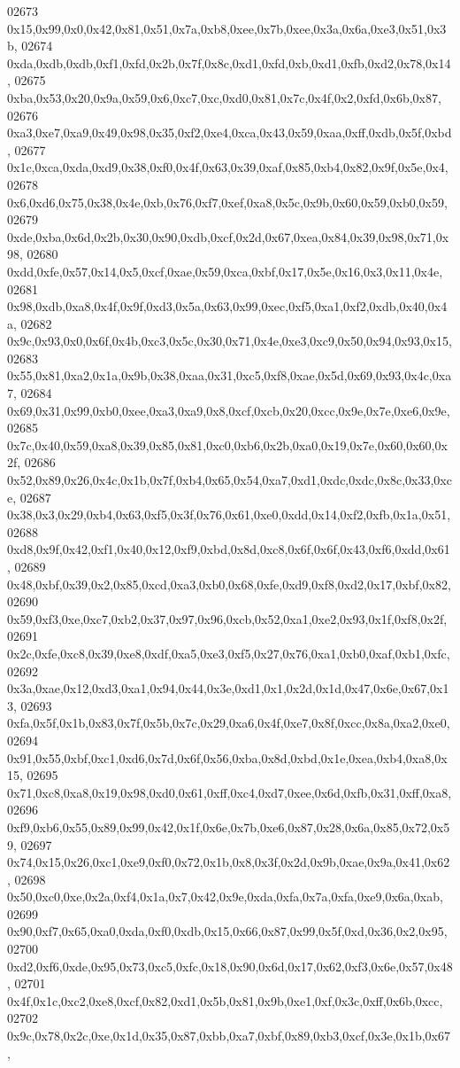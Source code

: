 \begin{DoxyCode}
02673   0x15,0x99,0x0,0x42,0x81,0x51,0x7a,0xb8,0xee,0x7b,0xee,0x3a,0x6a,0xe3,0x51,0x3b,
02674   0xda,0xdb,0xdb,0xf1,0xfd,0x2b,0x7f,0x8c,0xd1,0xfd,0xb,0xd1,0xfb,0xd2,0x78,0x14,
02675   0xba,0x53,0x20,0x9a,0x59,0x6,0xc7,0xc,0xd0,0x81,0x7c,0x4f,0x2,0xfd,0x6b,0x87,
02676   0xa3,0xe7,0xa9,0x49,0x98,0x35,0xf2,0xe4,0xca,0x43,0x59,0xaa,0xff,0xdb,0x5f,0xbd,
02677   0x1c,0xca,0xda,0xd9,0x38,0xf0,0x4f,0x63,0x39,0xaf,0x85,0xb4,0x82,0x9f,0x5e,0x4,
02678   0x6,0xd6,0x75,0x38,0x4e,0xb,0x76,0xf7,0xef,0xa8,0x5c,0x9b,0x60,0x59,0xb0,0x59,
02679   0xde,0xba,0x6d,0x2b,0x30,0x90,0xdb,0xcf,0x2d,0x67,0xea,0x84,0x39,0x98,0x71,0x98,
02680   0xdd,0xfe,0x57,0x14,0x5,0xcf,0xae,0x59,0xca,0xbf,0x17,0x5e,0x16,0x3,0x11,0x4e,
02681   0x98,0xdb,0xa8,0x4f,0x9f,0xd3,0x5a,0x63,0x99,0xec,0xf5,0xa1,0xf2,0xdb,0x40,0x4a,
02682   0x9c,0x93,0x0,0x6f,0x4b,0xc3,0x5c,0x30,0x71,0x4e,0xe3,0xc9,0x50,0x94,0x93,0x15,
02683   0x55,0x81,0xa2,0x1a,0x9b,0x38,0xaa,0x31,0xc5,0xf8,0xae,0x5d,0x69,0x93,0x4c,0xa7,
02684   0x69,0x31,0x99,0xb0,0xee,0xa3,0xa9,0x8,0xcf,0xcb,0x20,0xcc,0x9e,0x7e,0xe6,0x9e,
02685   0x7c,0x40,0x59,0xa8,0x39,0x85,0x81,0xc0,0xb6,0x2b,0xa0,0x19,0x7e,0x60,0x60,0x2f,
02686   0x52,0x89,0x26,0x4c,0x1b,0x7f,0xb4,0x65,0x54,0xa7,0xd1,0xdc,0xdc,0x8c,0x33,0xce,
02687   0x38,0x3,0x29,0xb4,0x63,0xf5,0x3f,0x76,0x61,0xe0,0xdd,0x14,0xf2,0xfb,0x1a,0x51,
02688   0xd8,0x9f,0x42,0xf1,0x40,0x12,0xf9,0xbd,0x8d,0xc8,0x6f,0x6f,0x43,0xf6,0xdd,0x61,
02689   0x48,0xbf,0x39,0x2,0x85,0xcd,0xa3,0xb0,0x68,0xfe,0xd9,0xf8,0xd2,0x17,0xbf,0x82,
02690   0x59,0xf3,0xe,0xc7,0xb2,0x37,0x97,0x96,0xcb,0x52,0xa1,0xe2,0x93,0x1f,0xf8,0x2f,
02691   0x2c,0xfe,0xc8,0x39,0xe8,0xdf,0xa5,0xe3,0xf5,0x27,0x76,0xa1,0xb0,0xaf,0xb1,0xfc,
02692   0x3a,0xae,0x12,0xd3,0xa1,0x94,0x44,0x3e,0xd1,0x1,0x2d,0x1d,0x47,0x6e,0x67,0x13,
02693   0xfa,0x5f,0x1b,0x83,0x7f,0x5b,0x7c,0x29,0xa6,0x4f,0xe7,0x8f,0xcc,0x8a,0xa2,0xe0,
02694   0x91,0x55,0xbf,0xc1,0xd6,0x7d,0x6f,0x56,0xba,0x8d,0xbd,0x1e,0xea,0xb4,0xa8,0x15,
02695   0x71,0xc8,0xa8,0x19,0x98,0xd0,0x61,0xff,0xc4,0xd7,0xee,0x6d,0xfb,0x31,0xff,0xa8,
02696   0xf9,0xb6,0x55,0x89,0x99,0x42,0x1f,0x6e,0x7b,0xe6,0x87,0x28,0x6a,0x85,0x72,0x59,
02697   0x74,0x15,0x26,0xc1,0xe9,0xf0,0x72,0x1b,0x8,0x3f,0x2d,0x9b,0xae,0x9a,0x41,0x62,
02698   0x50,0xc0,0xe,0x2a,0xf4,0x1a,0x7,0x42,0x9e,0xda,0xfa,0x7a,0xfa,0xe9,0x6a,0xab,
02699   0x90,0xf7,0x65,0xa0,0xda,0xf0,0xdb,0x15,0x66,0x87,0x99,0x5f,0xd,0x36,0x2,0x95,
02700   0xd2,0xf6,0xde,0x95,0x73,0xc5,0xfc,0x18,0x90,0x6d,0x17,0x62,0xf3,0x6e,0x57,0x48,
02701   0x4f,0x1c,0xc2,0xe8,0xcf,0x82,0xd1,0x5b,0x81,0x9b,0xe1,0xf,0x3c,0xff,0x6b,0xcc,
02702   0x9c,0x78,0x2c,0xe,0x1d,0x35,0x87,0xbb,0xa7,0xbf,0x89,0xb3,0xcf,0x3e,0x1b,0x67,

\end{DoxyCode}
